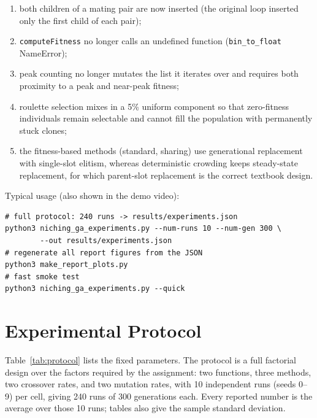 \documentclass[conference]{IEEEtran}
\begin{document}
\begin{enumerate}
\item both children of a mating pair are now inserted (the original loop
  inserted only the first child of each pair);
\item \texttt{computeFitness} no longer calls an undefined function
  (\texttt{bin\_to\_float} NameError);
\item peak counting no longer mutates the list it iterates over and requires
  both proximity to a peak and near-peak fitness;
\item roulette selection mixes in a 5\% uniform component so that
  zero-fitness individuals remain selectable and cannot fill the population
  with permanently stuck clones;
\item the fitness-based methods (standard, sharing) use generational
  replacement with single-slot elitism, whereas deterministic crowding keeps
  steady-state replacement, for which parent-slot replacement is the correct
  textbook design.
\end{enumerate}

Typical usage (also shown in the demo video):
\begin{lstlisting}[caption={Command-line usage}]
# full protocol: 240 runs -> results/experiments.json
python3 niching_ga_experiments.py --num-runs 10 --num-gen 300 \
        --out results/experiments.json
# regenerate all report figures from the JSON
python3 make_report_plots.py
# fast smoke test
python3 niching_ga_experiments.py --quick
\end{lstlisting}

\section{Experimental Protocol}
\label{sec:protocol}

Table~\ref{tab:protocol} lists the fixed parameters. The protocol is a full
factorial design over the factors required by the assignment: two functions,
three methods, two crossover rates, and two mutation rates, with 10
independent runs (seeds 0--9) per cell, giving 240 runs of 300 generations
each. Every reported number is the average over those 10 runs; tables also
give the sample standard deviation.
\end{document}
